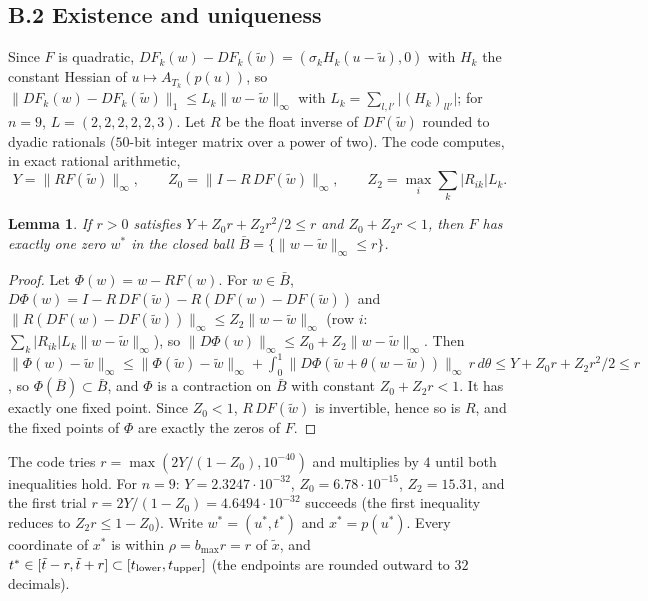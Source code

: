 \documentclass[11pt]{amsart}
\newtheorem{lemma}[theorem]{Lemma}
\theoremstyle{definition}
\newcommand{\tstar}{t^{*}}
\begin{document}
\subsection*{B.2 Existence and uniqueness}
Since $F$ is quadratic, $DF_k(w) - DF_k(\tilde w) = (\sigma_k H_k(u - \tilde u), 0)$ with $H_k$ the constant Hessian of $u \mapsto A_{T_k}(p(u))$, so $\|DF_k(w) - DF_k(\tilde w)\|_1 \le L_k\|w - \tilde w\|_\infty$ with $L_k = \sum_{l,l'}\lvert(H_k)_{ll'}\rvert$; for $n = 9$, $L = (2,2,2,2,2,3)$. Let $R$ be the float inverse of $DF(\tilde w)$ rounded to dyadic rationals ($50$-bit integer matrix over a power of two). The code computes, in exact rational arithmetic,
\[
 Y = \|RF(\tilde w)\|_\infty,\qquad Z_0 = \|I - R\,DF(\tilde w)\|_\infty,\qquad Z_2 = \max_i \sum_k \lvert R_{ik}\rvert L_k .
\]
\begin{lemma}\label{lem:krawczyk}
If $r > 0$ satisfies $Y + Z_0 r + Z_2r^2/2 \le r$ and $Z_0 + Z_2 r < 1$, then $F$ has exactly one zero $w^*$ in the closed ball $\bar B = \{\|w - \tilde w\|_\infty \le r\}$.
\end{lemma}
\begin{proof}
Let $\Phi(w) = w - RF(w)$. For $w \in \bar B$, $D\Phi(w) = I - R\,DF(\tilde w) - R(DF(w) - DF(\tilde w))$ and $\|R(DF(w) - DF(\tilde w))\|_\infty \le Z_2\|w-\tilde w\|_\infty$ (row $i$: $\sum_k\lvert R_{ik}\rvert L_k\|w - \tilde w\|_\infty$), so $\|D\Phi(w)\|_\infty \le Z_0 + Z_2\|w - \tilde w\|_\infty$. Then $\|\Phi(w) - \tilde w\|_\infty \le \|\Phi(\tilde w) - \tilde w\|_\infty + \int_0^1 \|D\Phi(\tilde w + \theta(w-\tilde w))\|_\infty\, r\,d\theta \le Y + Z_0r + Z_2r^2/2 \le r$, so $\Phi(\bar B) \subset \bar B$, and $\Phi$ is a contraction on $\bar B$ with constant $Z_0 + Z_2r < 1$. It has exactly one fixed point. Since $Z_0 < 1$, $R\,DF(\tilde w)$ is invertible, hence so is $R$, and the fixed points of $\Phi$ are exactly the zeros of $F$.
\end{proof}
The code tries $r = \max(2Y/(1-Z_0), 10^{-40})$ and multiplies by $4$ until both inequalities hold. For $n = 9$: $Y = 2.3247\cdot10^{-32}$, $Z_0 = 6.78\cdot10^{-15}$, $Z_2 = 15.31$, and the first trial $r = 2Y/(1-Z_0) = 4.6494\cdot10^{-32}$ succeeds (the first inequality reduces to $Z_2 r \le 1 - Z_0$). Write $w^* = (u^*,\tstar)$ and $x^* = p(u^*)$. Every coordinate of $x^*$ is within $\rho = b_{\max} r = r$ of $\tilde x$, and $\tstar \in [\tilde t - r, \tilde t + r] \subset [t_{\rm lower}, t_{\rm upper}]$ (the endpoints are rounded outward to $32$ decimals).
\end{document}
